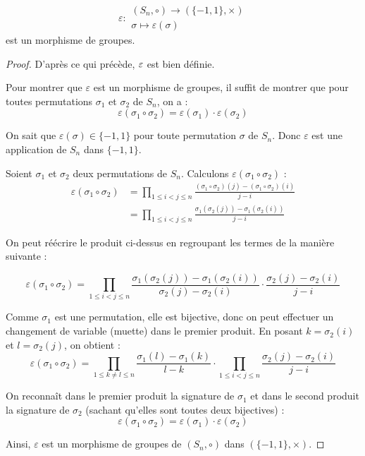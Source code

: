 \documentclass[12pt, a4paper]{report}
\begin{document}
\begin{property}
    $$\varepsilon : \begin{matrix} (S_n,\circ) \to (\{-1, 1\},\times) \\ \sigma \mapsto \varepsilon(\sigma) \end{matrix}$$
    est un morphisme de groupes.
\end{property}

\begin{proof}
    D'après ce qui précède, $\varepsilon$ est bien définie.

    Pour montrer que $\varepsilon$ est un morphisme de groupes, il suffit de montrer que pour toutes permutations $\sigma_1$ et $\sigma_2$ de $S_n$, on a :
    $$\varepsilon(\sigma_1 \circ \sigma_2) = \varepsilon(\sigma_1) \cdot \varepsilon(\sigma_2)$$

    On sait que $\varepsilon(\sigma) \in \{-1, 1\}$ pour toute permutation $\sigma$ de $S_n$. Donc $\varepsilon$ est une application de $S_n$ dans $\{-1, 1\}$.

    Soient $\sigma_1$ et $\sigma_2$ deux permutations de $S_n$. Calculons $\varepsilon(\sigma_1 \circ \sigma_2)$ :
    \begin{align*}
        \varepsilon(\sigma_1 \circ \sigma_2) &= \prod_{1 \le i < j \le n} \frac{(\sigma_1 \circ \sigma_2)(j) - (\sigma_1 \circ \sigma_2)(i)}{j - i} \\
        &= \prod_{1 \le i < j \le n} \frac{\sigma_1(\sigma_2(j)) - \sigma_1(\sigma_2(i))}{j - i}
    \end{align*}

    On peut réécrire le produit ci-dessus en regroupant les termes de la manière suivante :

    \[
    \varepsilon(\sigma_1 \circ \sigma_2) = \prod_{1 \le i < j \le n} \frac{\sigma_1(\sigma_2(j)) - \sigma_1(\sigma_2(i))}{\sigma_2(j) - \sigma_2(i)} \cdot \frac{\sigma_2(j) - \sigma_2(i)}{j - i}
    \]

    Comme $\sigma_1$ est une permutation, elle est bijective, donc on peut effectuer un changement de variable (muette) dans le premier produit. En posant $k = \sigma_2(i)$ et $l = \sigma_2(j)$, on obtient :
    \[
    \varepsilon(\sigma_1 \circ \sigma_2) = \prod_{1 \le k \ne l \le n} \frac{\sigma_1(l) - \sigma_1(k)}{l - k} \cdot \prod_{1 \le i < j \le n} \frac{\sigma_2(j) - \sigma_2(i)}{j - i}
    \]

    On reconnaît dans le premier produit la signature de $\sigma_1$ et dans le second produit la signature de $\sigma_2$ (sachant qu'elles sont toutes deux bijectives) :
    \[
    \varepsilon(\sigma_1 \circ \sigma_2) = \varepsilon(\sigma_1) \cdot \varepsilon(\sigma_2)
    \]

    Ainsi, $\varepsilon$ est un morphisme de groupes de $(S_n, \circ)$ dans $(\{-1, 1\}, \times)$.
\end{proof}
\end{document}
